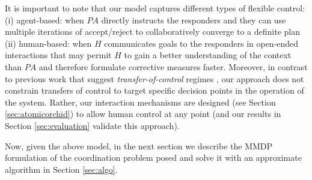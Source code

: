 It is important to note that our model captures different types of flexible control: (i) agent-based: when $PA$ directly instructs the responders  and they can use multiple iterations of accept/reject to collaboratively converge to a definite  plan (ii) human-based: when $H$ communicates goals to the responders in open-ended interactions that may permit $H$ to gain a better understanding of the context than $PA$ and therefore formulate corrective measures faster. Moreover, in contrast to previous work that suggest \emph{transfer-of-control} regimes \cite{scerri:etal:2005}, our approach does not constrain transfers of control to target specific decision points in the operation of the system. Rather, our interaction mechanisms are designed (see Section \ref{sec:atomicorchid}) to allow human control at any point (and our results  in Section \ref{sec:evaluation} validate this approach). 

Now, given the above model,  in the next section we describe the MMDP formulation of the coordination problem posed and solve it with an  approximate algorithm in Section \ref{sec:algo}.



